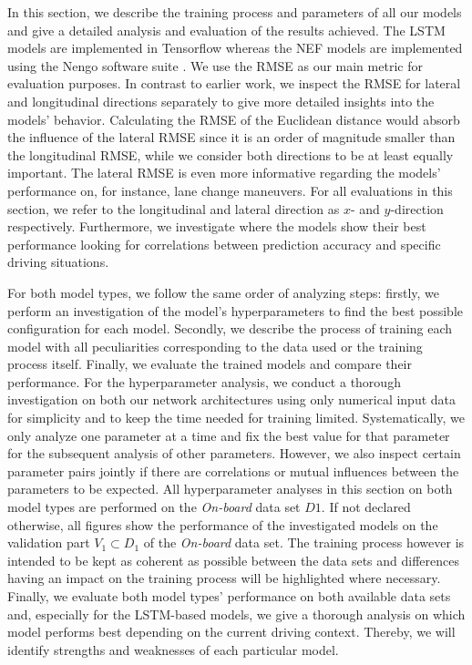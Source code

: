 In this section, we describe the training process and parameters of all our models and give a detailed analysis and evaluation of the results achieved.
The \ac{LSTM} models are implemented in Tensorflow \parencite{Abadi2016} whereas the \ac{NEF} models are implemented using the \acs{Nengo} software suite \parencite{Bekolay2014}.
We use the \ac{RMSE} as our main metric for evaluation purposes.
In contrast to earlier work, we inspect the \ac{RMSE} for lateral and longitudinal directions separately to give more detailed insights into the models' behavior.
Calculating the \ac{RMSE} of the Euclidean distance would absorb the influence of the lateral \ac{RMSE} since it is an order of magnitude smaller than the longitudinal \ac{RMSE}, while we consider both directions to be at least equally important.
The lateral \ac{RMSE} is even more informative regarding the models' performance on, for instance, lane change maneuvers.
For all evaluations in this section, we refer to the longitudinal and lateral direction as $x$- and $y$-direction respectively.
Furthermore, we investigate where the models show their best performance looking for correlations between prediction accuracy and specific driving situations.

For both model types, we follow the same order of analyzing steps: firstly, we perform an investigation of the model's hyperparameters to find the best possible configuration for each model.
Secondly, we describe the process of training each model with all peculiarities corresponding to the data used or the training process itself.
Finally, we evaluate the trained models and compare their performance.
For the hyperparameter analysis, we conduct a thorough investigation on both our network architectures using only numerical input data for simplicity and to keep the time needed for training limited.
Systematically, we only analyze one parameter at a time and fix the best value for that parameter for the subsequent analysis of other parameters.
However, we also inspect certain parameter pairs jointly if there are correlations or mutual influences between the parameters to be expected.
All hyperparameter analyses in this section on both model types are performed on the \emph{On-board} data set $D1$.
If not declared otherwise, all figures show the performance of the investigated models on the validation part $V_1 \subset D_1$ of the \emph{On-board} data set.
The training process however is intended to be kept as coherent as possible between the data sets and differences having an impact on the training process will be highlighted where necessary.
Finally, we evaluate both model types' performance on both available data sets and, especially for the \ac{LSTM}-based models, we give a thorough analysis on which model performs best depending on the current driving context.
Thereby, we will identify strengths and weaknesses of each particular model.

